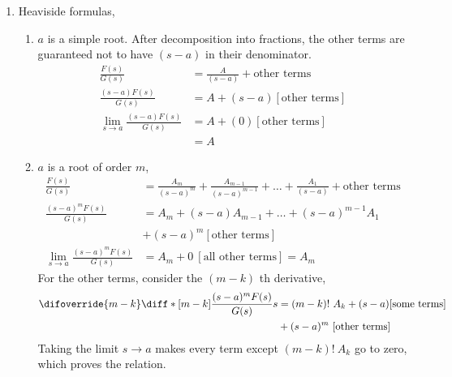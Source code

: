 \begin{enumerate}
    \item Heaviside formulas,
          \begin{enumerate}
              \item $ a $ is a simple root. After decomposition into fractions, the other
                    terms are guaranteed not to have $ (s-a) $ in their denominator.
                    \begin{align}
                        \frac{F(s)}{G(s)}      & = \frac{A}{(s-a)} + \text{other terms} \\
                        \frac{(s-a)F(s)}{G(s)} & = A + (s-a) [\text{other terms}]       \\
                        \lim_{s \rightarrow a}
                        \frac{(s-a)F(s)}{G(s)} & = A + (0) [\text{other terms}]         \\
                                               & = A
                    \end{align}

              \item $ a $ is a root of order $ m $,
                    \begin{align}
                        \frac{F(s)}{G(s)}         & = \frac{A_m}{(s-a)^m}
                        + \frac{A_{m-1}} {(s-a)^{m-1}} + \dots
                        + \frac{A_1}{(s-a)} + \text{other terms}                        \\
                        \frac{(s-a)^m F(s)}{G(s)} & = A_m + (s-a)A_{m-1} + \dots
                        + (s-a)^{m-1}A_1                                                \\
                                                  & + (s-a)^m [\text{other terms}]      \\
                        \lim_{s \rightarrow a}
                        \frac{(s-a)^m F(s)}{G(s)} & = A_m + 0\ [\text{all other terms}]
                        = A_m
                    \end{align}
                    For the other terms, consider the $ (m-k)$ th derivative,
                    \begin{align}
                        \difoverride{m-k}
                        \diff*[m-k]{\frac{(s-a)^m F(s)}
                        {G(s)}}{s} & = (m-k)!\ A_k
                        + (s-a) [\text{some terms}]                  \\
                                   & + (s-a)^m\ [\text{other terms}]
                    \end{align}
                    Taking the limit $ s \rightarrow a$ makes every term except
                    $ (m-k)!\ A_k $ go to zero, which proves the relation.
          \end{enumerate}


\end{enumerate}
